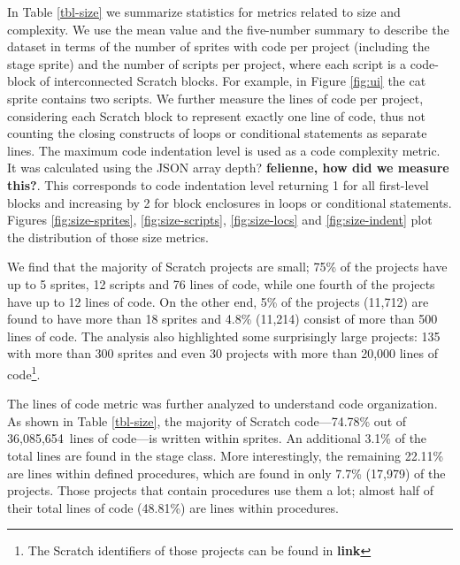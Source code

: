 \documentclass{sig-alternate}
\newcommand{\nLOC}{36,085,654}
\newcommand{\todo}[1]{\textbf{#1}}
\begin{document}
In Table \ref{tbl-size} we summarize statistics for metrics related to size and complexity. We use the mean value and the five-number summary to describe the dataset in terms of the number of sprites with code per project (including the stage sprite) and the number of scripts per project, where each script is a code-block of interconnected Scratch blocks. For example, in Figure \ref{fig:ui} the cat sprite contains two scripts. We further measure the lines of code per project, considering each Scratch block to represent exactly one line of code, thus not counting the closing constructs of loops or conditional statements as separate lines. The maximum code indentation level is used as a code complexity metric. It was calculated using the JSON array depth? \todo{felienne, how did we measure this?}. This corresponds to code indentation level returning 1 for all first-level blocks and increasing by 2 for block enclosures in loops or conditional statements. Figures \ref{fig:size-sprites}, \ref{fig:size-scripts}, \ref{fig:size-locs} and \ref{fig:size-indent} plot the distribution of those size metrics.

We find that the majority of Scratch projects are small; 75\% of the projects have up to 5 sprites, 12 scripts and 76 lines of code, while one fourth of the projects have up to 12 lines of code. On the other end, 5\% of the projects (11,712) are found to have more than 18 sprites and 4.8\% (11,214) consist of more than 500 lines of code. The analysis also highlighted some surprisingly large projects: 135 with more than 300 sprites and even 30 projects with more than 20,000 lines of code\footnote{The Scratch identifiers of those projects can be found in \todo{link}}.

The lines of code metric was further analyzed to understand code organization. As shown in Table \ref{tbl-size}, the majority of Scratch code---74.78\% out of \nLOC~lines of code---is written within sprites. An additional 3.1\% of the total lines are found in the stage class. More interestingly, the remaining 22.11\% are lines within defined procedures, which are found in only 7.7\% (17,979) of the projects. Those projects that contain procedures use them a lot; almost half of their total lines of code (48.81\%) are lines within procedures.
\end{document}
